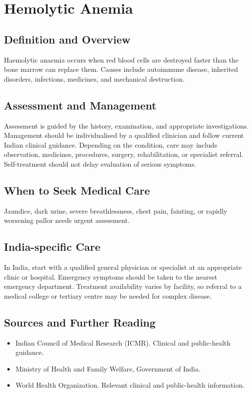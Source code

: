 \chapter{Hemolytic Anemia}

\section*{Definition and Overview}
Haemolytic anaemia occurs when red blood cells are destroyed faster than the bone marrow can replace them. Causes include autoimmune disease, inherited disorders, infections, medicines, and mechanical destruction.

\section*{Assessment and Management}
Assessment is guided by the history, examination, and appropriate investigations. Management should be individualised by a qualified clinician and follow current Indian clinical guidance. Depending on the condition, care may include observation, medicines, procedures, surgery, rehabilitation, or specialist referral. Self-treatment should not delay evaluation of serious symptoms.

\section*{When to Seek Medical Care}
Jaundice, dark urine, severe breathlessness, chest pain, fainting, or rapidly worsening pallor needs urgent assessment.

\section*{India-specific Care}
In India, start with a qualified general physician or specialist at an appropriate clinic or hospital. Emergency symptoms should be taken to the nearest emergency department. Treatment availability varies by facility, so referral to a medical college or tertiary centre may be needed for complex disease.

\section*{Sources and Further Reading}
\begin{itemize}
    \item Indian Council of Medical Research (ICMR). Clinical and public-health guidance.
    \item Ministry of Health and Family Welfare, Government of India.
    \item World Health Organization. Relevant clinical and public-health information.
\end{itemize}

